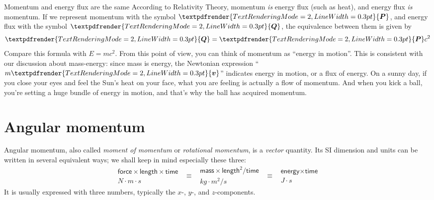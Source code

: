 \documentclass[a4paper,12pt,%
onecolumn,oneside,titlepage,%
british%
]{memoir}
\renewcommand*{\bm}[1]{\textpdfrender{TextRenderingMode=2,LineWidth=0.3pt}{\boldsymbol{#1}}}
\renewcommand*{\|}[1][]{\nonscript\:#1\vert\nonscript\:\mathopen{}}
\newcommand*{\masse}{mass-energy}
\begin{document}
\begin{extra}{Momentum and energy flux are the same}
  According to Relativity Theory, momentum \emph{is} energy flux (such as heat), and energy flux \emph{is} momentum. If we represent momentum with the symbol $\bm{P}$, and energy flux with the symbol $\bm{Q}$, the equivalence between them is given by
  \begin{equation}
    \label{eq:momentum_heat}
    \bm{Q} = \bm{P}c^{2}
  \end{equation}
  Compare this formula with $E=mc^{2}$. From this point of view, you can think of momentum as \enquote{energy in motion}. This is consistent with our discussion about \masse: since mass is energy, the Newtonian expression \enquote{$m\bm{v}$} indicates energy in motion, or a flux of energy. On a sunny day, if you close your eyes and feel the Sun's heat on your face, what you are feeling is actually a flow of momentum. And when you kick a ball, you're setting a huge bundle of energy in motion, and that's why the ball has acquired momentum.
\end{extra}



\section{Angular momentum}
\label{sec:intro_angmomentum}

Angular momentum, also called \emph{moment of momentum} or \emph{rotational momentum}, is a \emph{vector} quantity. Its SI dimension and units can be written in several equivalent ways; we shall keep in mind especially these three:
\begin{equation*}
  \begin{gathered}
    \textsf{force}\times\textsf{length}\times\textsf{time}
    \\\unit{N\cdot m\cdot s}
  \end{gathered}
\enspace  \equiv\enspace
  \begin{gathered}
  \textsf{mass}\times\textsf{length}^{2}/\textsf{time}
    \\\unit{kg\cdot m^{2}/s}
  \end{gathered}
\enspace  \equiv\enspace
  \begin{gathered}
  \textsf{energy}\times\textsf{time}
    \\\unit{J\cdot s}
  \end{gathered}
\end{equation*}
It is usually expressed with three numbers, typically the $x$-, $y$-, and $z$-components.
\end{document}
